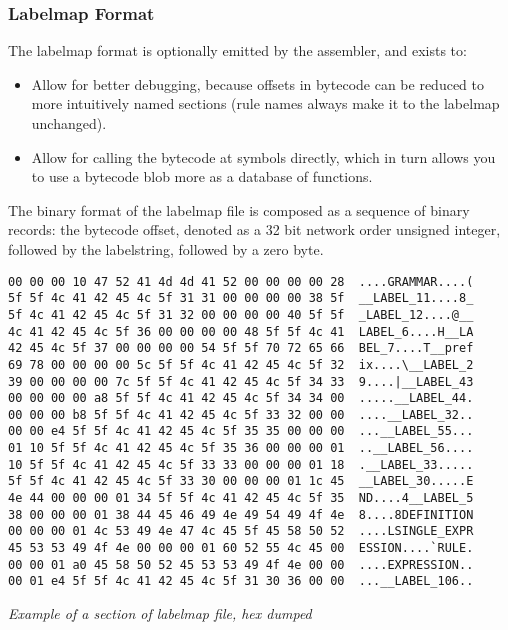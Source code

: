 \subsubsection{Labelmap Format}

The labelmap format is optionally emitted by the assembler, and exists to:

\begin{itemize}
\item Allow for better debugging, because offsets in bytecode can be reduced
      to more intuitively named sections (rule names always make it to
      the labelmap unchanged).
\item Allow for calling the bytecode at symbols directly, which in turn
      allows you to use a bytecode blob more as a database of functions.
\end{itemize}

The binary format of the labelmap file is composed as a sequence of
binary records: the bytecode offset, denoted as a 32 bit network order
unsigned integer, followed by the labelstring, followed by a zero byte.

\begin{myquote}
\begin{verbatim}
00 00 00 10 47 52 41 4d 4d 41 52 00 00 00 00 28  ....GRAMMAR....(
5f 5f 4c 41 42 45 4c 5f 31 31 00 00 00 00 38 5f  __LABEL_11....8_
5f 4c 41 42 45 4c 5f 31 32 00 00 00 00 40 5f 5f  _LABEL_12....@__
4c 41 42 45 4c 5f 36 00 00 00 00 48 5f 5f 4c 41  LABEL_6....H__LA
42 45 4c 5f 37 00 00 00 00 54 5f 5f 70 72 65 66  BEL_7....T__pref
69 78 00 00 00 00 5c 5f 5f 4c 41 42 45 4c 5f 32  ix....\__LABEL_2
39 00 00 00 00 7c 5f 5f 4c 41 42 45 4c 5f 34 33  9....|__LABEL_43
00 00 00 00 a8 5f 5f 4c 41 42 45 4c 5f 34 34 00  .....__LABEL_44.
00 00 00 b8 5f 5f 4c 41 42 45 4c 5f 33 32 00 00  ....__LABEL_32..
00 00 e4 5f 5f 4c 41 42 45 4c 5f 35 35 00 00 00  ...__LABEL_55...
01 10 5f 5f 4c 41 42 45 4c 5f 35 36 00 00 00 01  ..__LABEL_56....
10 5f 5f 4c 41 42 45 4c 5f 33 33 00 00 00 01 18  .__LABEL_33.....
5f 5f 4c 41 42 45 4c 5f 33 30 00 00 00 01 1c 45  __LABEL_30.....E
4e 44 00 00 00 01 34 5f 5f 4c 41 42 45 4c 5f 35  ND....4__LABEL_5
38 00 00 00 01 38 44 45 46 49 4e 49 54 49 4f 4e  8....8DEFINITION
00 00 00 01 4c 53 49 4e 47 4c 45 5f 45 58 50 52  ....LSINGLE_EXPR
45 53 53 49 4f 4e 00 00 00 01 60 52 55 4c 45 00  ESSION....`RULE.
00 00 01 a0 45 58 50 52 45 53 53 49 4f 4e 00 00  ....EXPRESSION..
00 01 e4 5f 5f 4c 41 42 45 4c 5f 31 30 36 00 00  ...__LABEL_106..
\end{verbatim}
\end{myquote}
\textit{Example of a section of labelmap file, hex dumped}

